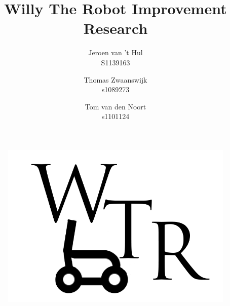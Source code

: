 \documentclass{article} %
\title{\huge Willy The Robot Improvement Research}
\author{Jeroen van 't Hul\\S1139163  \and Thomas Zwaanswijk\\s1089273 \and Tom van den Noort\\s1101124}
\date{\parbox{\linewidth}{\centering%
	\today\endgraf\bigskip
	Supervisor \hspace*{3cm} Main Stakeholder \endgraf\medskip
	Mischa Mol \hspace*{3cm} Ilja Clabbers \endgraf\bigskip
	Windesheim Zwolle\endgraf}}
\begin{document}
\maketitle

\begin{figure}[H]
\centering
\includegraphics[width=12 cm]{WTRLogo.png}
\end{figure}
\thispagestyle{empty}
\newpage
\setcounter{page}{1}
\tableofcontents
\newpage







\appendix %

\newpage


\end{document}
